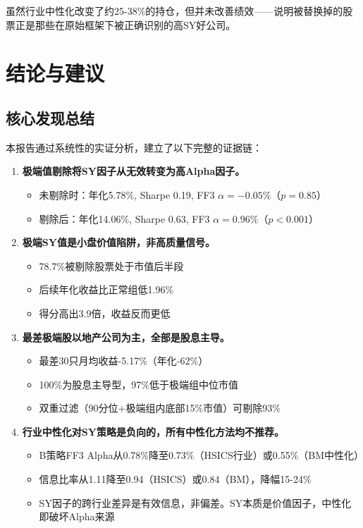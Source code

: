 \documentclass[10pt,a4paper]{ctexart}
\begin{document}
虽然行业中性化改变了约25-38\%的持仓，但并未改善绩效——说明被替换掉的股票正是那些在原始框架下被正确识别的高SY好公司。

\section{结论与建议}

\subsection{核心发现总结}

本报告通过系统性的实证分析，建立了以下完整的证据链：

\begin{enumerate}[label=\textbf{发现\arabic*：}, leftmargin=*]
    \item \textbf{极端值剔除将SY因子从无效转变为高Alpha因子。}
    \begin{itemize}
        \item 未剔除时：年化5.78\%, Sharpe 0.19, FF3 $\alpha=-0.05\%$（$p=0.85$）
        \item 剔除后：年化14.06\%, Sharpe 0.63, FF3 $\alpha=0.96\%$（$p<0.001$）
    \end{itemize}

    \item \textbf{极端SY值是小盘价值陷阱，非高质量信号。}
    \begin{itemize}
        \item 78.7\%被剔除股票处于市值后半段
        \item 后续年化收益比正常组低1.96\%
        \item 得分高出3.9倍，收益反而更低
    \end{itemize}

    \item \textbf{最差极端股以地产公司为主，全部是股息主导。}
    \begin{itemize}
        \item 最差30只月均收益-5.17\%（年化-62\%）
        \item 100\%为股息主导型，97\%低于极端组中位市值
        \item 双重过滤（90分位+极端组内底部15\%市值）可剔除93\%
    \end{itemize}

    \item \textbf{行业中性化对SY策略是负向的，所有中性化方法均不推荐。}
    \begin{itemize}
        \item B策略FF3 Alpha从0.78\%降至0.73\%（HSICS行业）或0.55\%（BM中性化）
        \item 信息比率从1.11降至0.94（HSICS）或0.84（BM），降幅15-24\%
        \item SY因子的跨行业差异是有效信息，非偏差。SY本质是价值因子，中性化即破坏Alpha来源
    \end{itemize}


\end{enumerate}
\end{document}
